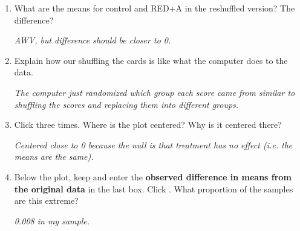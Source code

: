 \begin{enumerate}
\begin{enumerate}
\begin{key}
  {\it  They should! If it's reversed, swap the order in the data.}
\end{key}

    \item  What are the means for control and RED+A in the
      reshuffled version?  The difference?
\begin{students}
    \vspace{1cm}    
\end{students}

\begin{key}
  {\it  AWV, but difference should be closer to 0.}
\end{key}



 \item Explain how our shuffling the cards is like what the computer does to
   the data.
\begin{students}
    \vspace{3cm}    
\end{students}

\begin{key}
  {\it  The computer just randomized which group each score came from
   similar to shuffling the scores and replacing them into different
   groups.  }
\end{key}

 \item Click    three times.  Where is the plot
   centered?   Why is it centered there?
\begin{students}
    \vspace{1.5cm}    
\end{students}

\begin{key}
  {\it     Centered close to 0 because the null is that treatment has no
   effect (i.e. the means are the same). }
\end{key}


 \item  Below the plot, keep    and  enter the
   {\bf observed difference in means from the original data} in the
   last box.  Click . What proportion of the samples are this
   extreme?   
\begin{students}
    \vspace{1cm}    
\end{students}

\begin{key}
  {\it 0.008 in my sample. }
\end{key}


\end{enumerate}
\end{enumerate}

